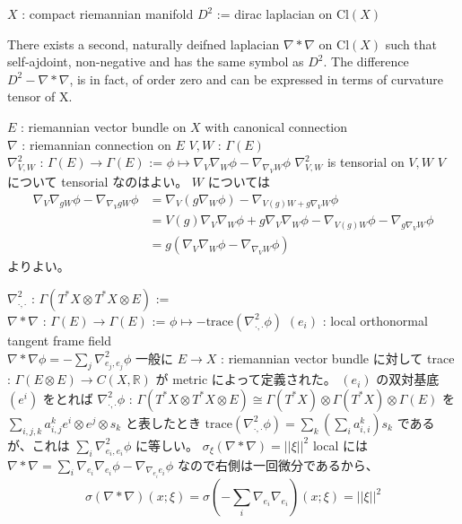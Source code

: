 \begin{When}
\itemwhen \Fix \(X\) : compact riemannian manifold
\itemwhen \Let \(D^2\) := dirac laplacian on \(\text{Cl}(X)\)
\end{When}

There exists a second, naturally deifned laplacian \(\nabla * \nabla\) on \(\text{Cl}(X)\) such that self-ajdoint, non-negative and has the same symbol as \(D^2\). 
The difference \(D^2 - \nabla * \nabla\), is in fact, of order zero and can be expressed in terms of curvature tensor of X.

\begin{Definition}
\itemwhen
  \Fix \(E\) : riemannian vector bundle on \(X\) with canonical connection \\
  \Fix \(\nabla\) : riemannian connection on \(E\)
\itemdefi
  \For \(V,W\) : \(\Gamma(E)\) \\
  \Define \(\nabla_{V,W}^2\) : \(\Gamma(E) \to \Gamma(E)\) := \(\phi \mapsto \nabla_V \nabla_W \phi - \nabla_{\nabla_V W} \phi\)
\itemprop
  \(\nabla_{V,W}^2\) is tensorial on \(V , W\)
\itemprof
  \(V\) について tensorial なのはよい。 \(W\) については
  \begin{align*}
    \nabla_V \nabla_{g W} \phi - \nabla_{\nabla_V g W} \phi
    &= \nabla_V (g \nabla_W \phi) - \nabla_{V(g) W + g \nabla_V W} \phi \\
    &= V(g) \nabla_V \nabla_W \phi + g \nabla_V \nabla_W \phi - \nabla_{V(g) W} \phi - \nabla_{g \nabla_V W} \phi \\
    &= g (\nabla_V \nabla_W \phi - \nabla_{\nabla_V W} \phi)
  \end{align*}
  よりよい。
\end{Definition}

\begin{Definition}
\itemdefi
  \Define \(\nabla_{\cdot , \cdot}^2\) : \(\Gamma(T^*X \otimes T^*X \otimes E)\) :=  \\
  \Define \(\nabla * \nabla\) : \(\Gamma(E) \to \Gamma(E)\) := \(\phi \mapsto - \text{trace}(\nabla_{\cdot , \cdot }^2 \phi)\)
\itemprop
  \For \((e_i)\) : local orthonormal tangent frame field \\
  \Then \(\nabla*\nabla \phi = - \sum_j \nabla_{e_j , e_j}^2\phi\)
\itemprof
  一般に \(E \to X\) : riemannian vector bundle に対して trace : \(\Gamma(E \otimes E) \to C(X , \mathbb{R})\) が metric によって定義された。
  \((e_i)\) の双対基底 \((e^i)\) をとれば \(\nabla_{\cdot , \cdot}^2 \phi\) : \(\Gamma(T^*X \otimes T^*X \otimes E) \cong \Gamma(T^*X) \otimes \Gamma(T^*X) \otimes \Gamma(E)\) を \(\sum_{i,j,k} a^k_{i,j} e^i \otimes e^j \otimes s_k\) と表したとき \(\text{trace}(\nabla_{\cdot , \cdot }^2 \phi) = \sum_{k} (\sum_i a^k_{i,i}) s_k\) であるが、これは \(\sum_i \nabla_{e_i , e_i}^2 \phi\) に等しい。
\itemprop
  \Then \(\sigma_{\xi}(\nabla * \nabla) = || \xi || ^2\)
\itemprof
  local には \(\nabla * \nabla = \sum_i \nabla_{e_i} \nabla_{e_i} \phi - \nabla_{\nabla_{e_i} e_i} \phi\) なので右側は一回微分であるから、
  \[\sigma(\nabla * \nabla)(x ; \xi) = \sigma(- \sum_i \nabla_{e_i} \nabla_{e_i})(x ; \xi) = || \xi ||^2\]
  \SORRY
\end{Definition}

